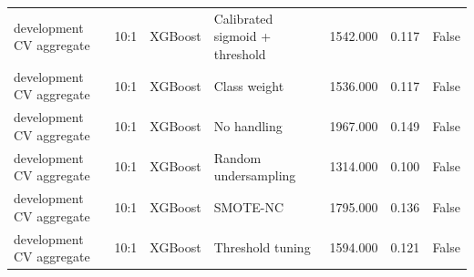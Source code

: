 \begin{tabular}{llllrrr}
development CV aggregate & 10:1 & XGBoost & Calibrated sigmoid + threshold & 1542.000 & 0.117 & False \\
development CV aggregate & 10:1 & XGBoost & Class weight & 1536.000 & 0.117 & False \\
development CV aggregate & 10:1 & XGBoost & No handling & 1967.000 & 0.149 & False \\
development CV aggregate & 10:1 & XGBoost & Random undersampling & 1314.000 & 0.100 & False \\
development CV aggregate & 10:1 & XGBoost & SMOTE-NC & 1795.000 & 0.136 & False \\
development CV aggregate & 10:1 & XGBoost & Threshold tuning & 1594.000 & 0.121 & False \\
\bottomrule
\end{tabular}
